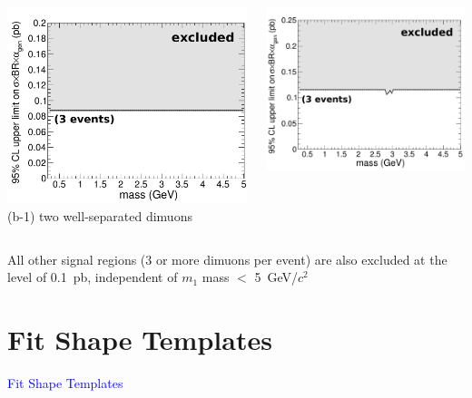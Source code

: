 \documentclass[compress]{beamer}
\begin{document}
\begin{frame}
\begin{columns}
\includegraphics[width=\linewidth]{ul__sig_a2_n4.pdf}
\centering (b-1) two well-separated dimuons

\includegraphics[width=\linewidth]{ul__sig_b1_n3.pdf}
\end{columns}

All other signal regions (3 or more dimuons per event) are also
excluded at the level of 0.1~pb, independent of $m_1$ mass $<$ 5~GeV/$c^2$
\end{frame}

\section*{Fit Shape Templates}
\begin{frame}

\vfill
\begin{center}
\Huge \textcolor{blue}{Fit Shape Templates}
\end{center}

\vfill
\end{frame}
\end{document}
